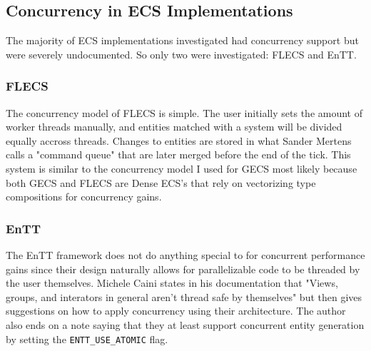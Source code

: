 
\subsection{Concurrency in ECS Implementations}
The majority of ECS implementations investigated had concurrency support but were severely undocumented. So only two were investigated: FLECS and EnTT.

\subsubsection{FLECS}
The concurrency model of FLECS is simple. The user initially sets the amount of worker threads manually, and entities matched with a system will be divided equally accross threads. Changes to entities are stored in what Sander Mertens calls a "command queue" that are later merged before the end of the tick.\cite{missing_docs} This system is similar to the concurrency model I used for GECS most likely because both GECS and FLECS are Dense ECS's that rely on vectorizing type compositions for concurrency gains.

\subsubsection{EnTT}
The EnTT framework does not do anything special to for concurrent performance gains since their design naturally allows for parallelizable code to be threaded by the user themselves. Michele Caini states in his documentation that "Views, groups, and interators in general aren't thread safe by themselves" but then gives suggestions on how to apply concurrency using their architecture. The author also ends on a note saying that they at least support concurrent entity generation by setting the \texttt{ENTT\_USE\_ATOMIC} flag.\cite{EnTT_multithreading}